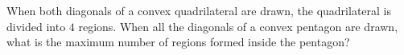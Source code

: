 When both diagonals of a convex quadrilateral are drawn, the quadrilateral is divided into $4$ regions. When all the diagonals of a convex pentagon are drawn, what is the maximum number of regions formed inside the pentagon?
